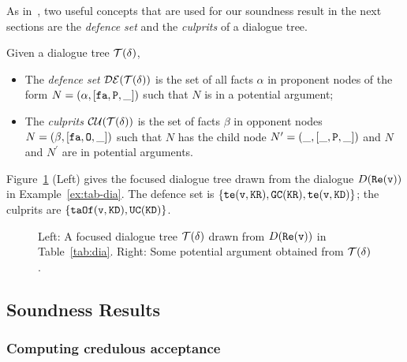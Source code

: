  As in~\cite{DUNG2006114}, two useful concepts that are used for our soundness result in the next sections are the \emph{defence set} and the \emph{culprits} of a dialogue tree. 
 \begin{definition}
 Given a dialogue tree $\mathcal{T}(\delta)$, 
 \begin{itemize}
 \item The \emph{defence set} $\mathcal{DE}(\mathcal{T}(\delta))$ is the set of  all facts $\alpha$ in proponent nodes of the form $N = (\alpha,[ \texttt{\textup{fa}}, \texttt{\textup{P}}, \_])$ such that $N$ is in a potential argument;

\item The \emph{culprits} $\mathcal{CU}(\mathcal{T}(\delta))$ is the set of facts $\beta$ in opponent nodes $N = (\beta, [\texttt{\textup{fa}}, \texttt{\textup{O}}, \_])$ such that $N$ has the child node $N^{\prime} = (\_,[ \_, \texttt{\textup{P}}, \_])$ and $N$ and $N^{\prime}$ are in potential arguments.
\end{itemize}
\end{definition}

\begin{example}
Figure~\ref{fig:comple-tree} (Left) gives the focused dialogue tree drawn from the dialogue $D(\texttt{\textup{Re}}(\texttt{\textup{v}}))$ in Example~\ref{ex:tab-dia}. The defence set is  $\{\texttt{\textup{te}}(\texttt{\textup{v}}, \texttt{\textup{KR}}), \texttt{\textup{GC}}(\texttt{\textup{KR}}), \texttt{\textup{te}}(\texttt{\textup{v}}, \texttt{\textup{KD}})\}$; the culprits are $\{\texttt{\textup{taOf}}(\texttt{\textup{v}}, \texttt{\textup{KD}}), \texttt{\textup{UC}}(\texttt{\textup{KD}})\}$.
\end{example}


\begin{figure}
\centering
{}
\caption{
Left:
A focused dialogue tree $\mathcal{T}(\delta)$ drawn from $D(\texttt{\textup{Re}}(\texttt{\textup{v}}))$ in Table~\ref{tab:dia}.
Right: Some potential argument obtained from $\mathcal{T}(\delta)$.
}
\label{fig:comple-tree}
\end{figure}


\subsection{Soundness Results}
\label{sec:soundness}

\subsubsection{Computing credulous acceptance}
\label{sec:credulously-success}

